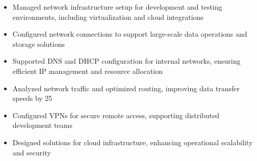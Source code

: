 \par\smallskip
\noindent
\begin{minipage}{20cm}
  \begin{minipage}{9.75cm}
    \begin{itemize}
      \item Managed network infrastructure setup for development and testing environments, including virtualization and cloud integrations
      \item Configured network connections to support large-scale data operations and storage solutions
      \item Supported DNS and DHCP configuration for internal networks, ensuring efficient IP management and resource allocation
    \end{itemize}
  \end{minipage}
  \hfill
  \begin{minipage}{9.75cm}
    \begin{itemize}
      \item Analyzed network traffic and optimized routing, improving data transfer speeds by 25%
      \item Configured VPNs for secure remote access, supporting distributed development teams
      \item Designed solutions for cloud infrastructure, enhancing operational scalability and security
    \end{itemize}
  \end{minipage}
\end{minipage}
\par\smallskip
\divider

